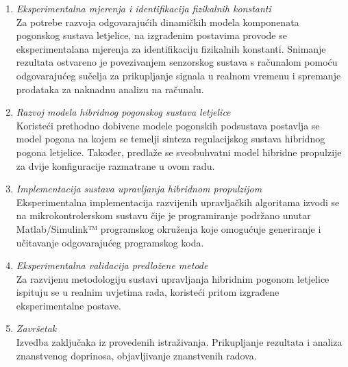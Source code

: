 \begin{prosirenisazetak}
\begin{enumerate}
		
		\item \textit{Eksperimentalna mjerenja i identifikacija fizikalnih konstanti} \\
	Za potrebe razvoja odgovarajućih dinamičkih modela komponenata pogonskog sustava letjelice, na izgrađenim postavima provode se eksperimentalana mjerenja za identifikaciju fizikalnih konstanti. Snimanje rezultata ostvareno je povezivanjem senzorskog sustava s računalom pomoću odgovarajućeg sučelja za prikupljanje signala u realnom vremenu i spremanje prodataka za naknadnu analizu na računalu. 

		
		\item \textit{Razvoj modela hibridnog pogonskog sustava letjelice} \\
		Koristeći prethodno dobivene modele pogonskih podsustava postavlja se model pogona na kojem se temelji sinteza regulacijskog sustava hibridnog pogona letjelice. Također, predlaže se sveobuhvatni model hibridne propulzije za dvije konfiguracije razmatrane u ovom radu.

		
		\item \textit{Implementacija sustava upravljanja hibridnom propulzijom} \\  
		Eksperimentalna implementacija razvijenih upravljačkih algoritama izvodi se na  mikrokontrolerskom sustavu čije je programiranje podržano unutar Matlab/Simulink™ programskog okruženja koje omogućuje generiranje i učitavanje odgovarajućeg programskog koda. 

		
		\item \textit{Eksperimentalna validacija predložene metode}\\
		Za razvijenu metodologiju sustavi upravljanja hibridnim pogonom letjelice ispituju se u realnim uvjetima rada, koristeći pritom izgrađene eksperimentalne postave.

		
		\item \textit{Završetak} \\
		Izvedba zaključaka iz provedenih istraživanja. Prikupljanje rezultata i analiza znanstvenog doprinosa, objavljivanje znanstvenih radova.

		
	\end{enumerate}

	
	
	
\end{prosirenisazetak}